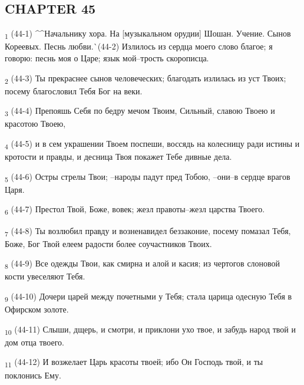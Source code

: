 \subsection{CHAPTER 45}
\begin{tcolorbox}
\textsubscript{1} (44-1) ^^Начальнику хора. На [музыкальном орудии] Шошан. Учение. Сынов Кореевых. Песнь любви.^^ (44-2) Излилось из сердца моего слово благое; я говорю: песнь моя о Царе; язык мой--трость скорописца.
\end{tcolorbox}
\begin{tcolorbox}
\textsubscript{2} (44-3) Ты прекраснее сынов человеческих; благодать излилась из уст Твоих; посему благословил Тебя Бог на веки.
\end{tcolorbox}
\begin{tcolorbox}
\textsubscript{3} (44-4) Препояшь Себя по бедру мечом Твоим, Сильный, славою Твоею и красотою Твоею,
\end{tcolorbox}
\begin{tcolorbox}
\textsubscript{4} (44-5) и в сем украшении Твоем поспеши, воссядь на колесницу ради истины и кротости и правды, и десница Твоя покажет Тебе дивные дела.
\end{tcolorbox}
\begin{tcolorbox}
\textsubscript{5} (44-6) Остры стрелы Твои; --народы падут пред Тобою, --они--в сердце врагов Царя.
\end{tcolorbox}
\begin{tcolorbox}
\textsubscript{6} (44-7) Престол Твой, Боже, вовек; жезл правоты--жезл царства Твоего.
\end{tcolorbox}
\begin{tcolorbox}
\textsubscript{7} (44-8) Ты возлюбил правду и возненавидел беззаконие, посему помазал Тебя, Боже, Бог Твой елеем радости более соучастников Твоих.
\end{tcolorbox}
\begin{tcolorbox}
\textsubscript{8} (44-9) Все одежды Твои, как смирна и алой и касия; из чертогов слоновой кости увеселяют Тебя.
\end{tcolorbox}
\begin{tcolorbox}
\textsubscript{9} (44-10) Дочери царей между почетными у Тебя; стала царица одесную Тебя в Офирском золоте.
\end{tcolorbox}
\begin{tcolorbox}
\textsubscript{10} (44-11) Слыши, дщерь, и смотри, и приклони ухо твое, и забудь народ твой и дом отца твоего.
\end{tcolorbox}
\begin{tcolorbox}
\textsubscript{11} (44-12) И возжелает Царь красоты твоей; ибо Он Господь твой, и ты поклонись Ему.
\end{tcolorbox}
